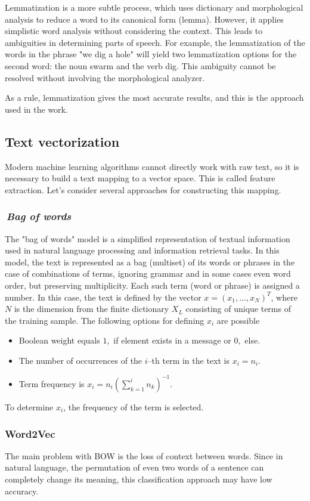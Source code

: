 \documentclass[12pt]{jpconf}
\begin{document}
Lemmatization is a more subtle process, which uses dictionary and morphological analysis to reduce a word to its canonical form (lemma). However, it applies simplistic word analysis without considering the context. This leads to ambiguities in determining parts of speech. For example, the lemmatization of the words in the phrase "we dig a hole" will yield two lemmatization options for the second word: the noun swarm and the verb dig. This ambiguity cannot be resolved without involving the morphological analyzer.

As a rule, lemmatization gives the most accurate results, and this is the approach used in the work.

\subsection{Text vectorization}
Modern machine learning algorithms cannot directly work with raw text, so it is necessary to build a text mapping to a vector space. This is called feature extraction. Let's consider several approaches for constructing this mapping.

\subsubsection{\it\,Bag of words}
The "bag of words" model is a simplified representation of textual information used in natural language processing and information retrieval tasks. In this model, the text is represented as a bag (multiset) of its words or phrases in the case of combinations of terms, ignoring grammar and in some cases even word order, but preserving multiplicity. Each such term (word or phrase) is assigned a number. In this case, the text is defined by the vector $x=(x_1,..., x_N)^T$, where $N$ is the dimension from the finite dictionary $X_L$ consisting of unique terms of the training sample. The following options for defining $x_i$ are possible
\begin{itemize}
\item Boolean weight equals $1,$ if element exists in a message or 
$0,$ else.
\item The number of occurrences of the $i$--th term in the text is 
$x_i = n_i.$
\item Term frequency is $x_i = n_i\left(\sum\limits_{k=1}^i n_k\right)^{-1}.$
\end{itemize}
To determine $x_i$, the frequency of the term is selected.

\subsubsection{Word2Vec}
The main problem with BOW is the loss of context between words. Since in natural language, the permutation of even two words of a sentence can completely change its meaning, this classification approach may have low accuracy.
\end{document}
